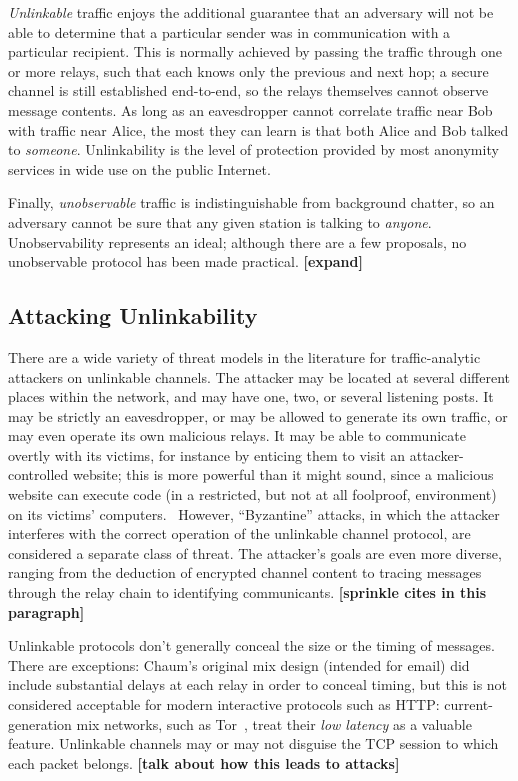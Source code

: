 \documentclass{zarticle}
\def\todo#1{{\color{todocolor}\bfseries [#1]}}
\begin{document}
\emph{Unlinkable} traffic enjoys the additional guarantee that an
adversary will not be able to determine that a particular sender was
in communication with a particular recipient.  This is normally
achieved by passing the traffic through one or more relays, such that
each knows only the previous and next hop; a secure channel is still
established end-to-end, so the relays themselves cannot observe
message contents.  As long as an eavesdropper cannot correlate traffic
near Bob with traffic near Alice, the most they can learn is that both
Alice and Bob talked to \emph{someone}.  Unlinkability is the level of
protection provided by most anonymity services in wide use on the
public Internet.

Finally, \emph{unobservable} traffic is indistinguishable from
background chatter, so an adversary cannot be sure that any given
station is talking to \emph{anyone}.  Unobservability represents an
ideal; although there are a few proposals, no unobservable protocol
has been made practical.  \todo{expand}

\subsection{Attacking Unlinkability}

There are a wide variety of threat models in the literature for
traffic-analytic attackers on unlinkable channels.  The attacker may
be located at several different places within the network, and may
have one, two, or several listening posts.  It may be strictly an
eavesdropper, or may be allowed to generate its own traffic, or may
even operate its own malicious relays.  It may be able to communicate
overtly with its victims, for instance by enticing them to visit an
attacker-controlled website; this is more powerful than it might
sound, since a malicious website can execute code (in a restricted,
but not at all foolproof, environment) on its victims'
computers.~\cite{barth2008securing} However, “Byzantine” attacks, in
which the attacker interferes with the correct operation of the
unlinkable channel protocol, are considered a separate class of
threat.  The attacker's goals are even more diverse, ranging from
the deduction of encrypted channel content to tracing messages through
the relay chain to identifying communicants. \todo{sprinkle cites in
  this paragraph}

Unlinkable protocols don't generally conceal the size or the timing of
messages.  There are exceptions: Chaum's original mix design (intended
for email) did include substantial delays at each relay in order to
conceal timing, but this is not considered acceptable for modern
interactive protocols such as HTTP: current-generation mix networks,
such as Tor~\cite{dingledine2004tor}, treat their \emph{low latency}
as a valuable feature.  Unlinkable channels may or may not disguise
the TCP session to which each packet belongs. \todo{talk about how
  this leads to attacks}
\end{document}
